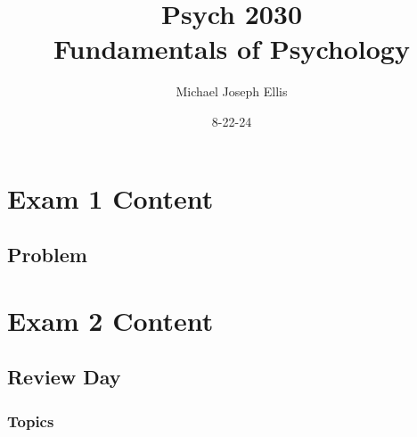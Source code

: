 \documentclass{report}
\title{\Huge{Psych 2030}\\Fundamentals of Psychology}
\author{\huge{Michael Joseph Ellis}}
\date{8-22-24}
\begin{document}
\maketitle
\newpage 
{}
\tableofcontents
\pagebreak

\chapter{Exam 1 Content}
\section{Problem}

\chapter{Exam 2 Content}

\section{Review Day}

\subsection{Topics}
\end{document}
